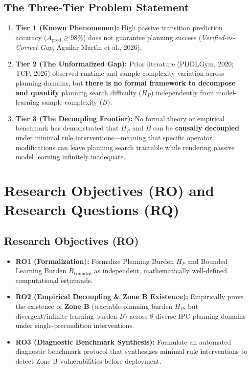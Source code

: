 \documentclass[11pt,a4paper]{article}
\theoremstyle{definition}
\begin{document}
\subsection{The Three-Tier Problem Statement}
\begin{enumerate}[leftmargin=*]
    \item \textbf{Tier 1 (Known Phenomenon):} High passive transition prediction accuracy ($A_{\text{pred}} \ge 98\%$) does not guarantee planning success (\textit{Verified-vs-Correct Gap}, Aguilar Mart{\'\i}n et al., 2026).
    \item \textbf{Tier 2 (The Unformalized Gap):} Prior literature (PDDLGym, 2020; TCP, 2026) observed runtime and sample complexity variation across planning domains, but \textbf{there is no formal framework to decompose and quantify} planning search difficulty ($H_P$) independently from model-learning sample complexity ($B$).
    \item \textbf{Tier 3 (The Decoupling Frontier):} No formal theory or empirical benchmark has demonstrated that $H_P$ and $B$ can be \textbf{causally decoupled} under minimal rule interventions---meaning that specific operator modifications can leave planning search tractable while rendering passive model learning infinitely inadequate.
\end{enumerate}

\section{Research Objectives (RO) and Research Questions (RQ)}

\subsection{Research Objectives (RO)}
\begin{itemize}[leftmargin=*]
    \item \textbf{RO1 (Formalization):} Formalize Planning Burden $H_P$ and Bounded Learning Burden $B_{\text{bounded}}$ as independent, mathematically well-defined computational estimands.
    \item \textbf{RO2 (Empirical Decoupling \& Zone B Existence):} Empirically prove the existence of \textbf{Zone B} (tractable planning burden $H_P$, but divergent/infinite learning burden $B$) across 8 diverse IPC planning domains under single-precondition interventions.
    \item \textbf{RO3 (Diagnostic Benchmark Synthesis):} Formulate an automated diagnostic benchmark protocol that synthesizes minimal rule interventions to detect Zone B vulnerabilities before deployment.
\end{itemize}
\end{document}
